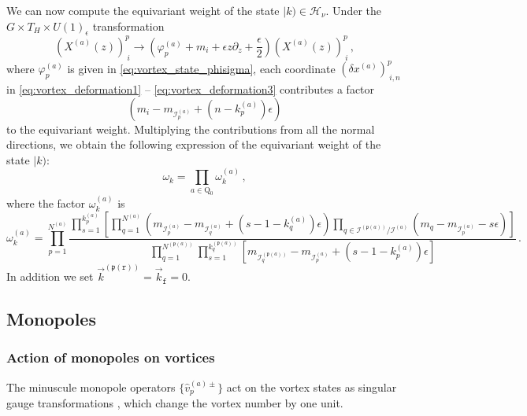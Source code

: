 \documentclass[12pt,a4paper]{article}
\renewcommand{\(}{\left(}
\renewcommand{\)}{\right)}
\newcommand{\eps}{\epsilon}
\renewcommand{\(}{\left(}
\renewcommand{\)}{\right)}
\begin{document}
We can now compute the equivariant weight of the state $|k)\in\mathcal{H}_\nu$. Under the $G\times T_H\times U(1)_\eps$ transformation
\begin{equation}
\left(X^{(a)}(z)\right)^p_{\ i}\longrightarrow (\varphi^{(a)}_p+m_i+\eps z\partial_z+\frac{\eps}{2})\left(X^{(a)}(z)\right)^p_{\ i}\,,
\end{equation}
where $\varphi^{(a)}_p$ is given in \eqref{eq:vortex_state_phisigma}, each coordinate $(\delta x^{(a)})^p_{\ i,n}$ in \eqref{eq:vortex_deformation1} -- \eqref{eq:vortex_deformation3} contributes a factor
\begin{equation}
(m_i-m_{\mathcal{I}^{(a)}_p}+(n-k^{(a)}_p)\eps)
\end{equation}
to the equivariant weight. Multiplying the contributions from all the normal directions, we obtain the following expression of the equivariant weight of the state $|k)$:
\begin{equation}\label{eq:omegak}
\omega_k=\prod_{a\in \mathrm{Q}_0}\omega^{(a)}_{k}\,,
\end{equation}
where the factor $\omega^{(a)}_{k}$ is
{\footnotesize
\begin{equation}
\omega^{(a)}_{k}=\prod_{p=1}^{N^{(a)}}\frac{\prod_{s=1}^{k^{(a)}_{p}}\left[\prod_{q=1}^{N^{(a)}}(m_{\mathcal{I}^{(a)}_{p}}-m_{\mathcal{I}^{(a)}_{q}}+(s-1-k^{(a)}_{q})\epsilon) \prod_{q\in \mathcal{I}^{(\mathfrak{p}(a))}/\mathcal{I}^{(a)}}(m_q-m_{\mathcal{I}^{(a)}_{p}}-s\epsilon)  \right]}{\prod_{q=1}^{N^{(\mathfrak{p}(a))}}\prod_{s=1}^{k^{(\mathfrak{p}(a))}_{q}}\left[m_{\mathcal{I}^{(\mathfrak{p}(a))}_{q}}-m_{\mathcal{I}^{(a)}_{p}}+(s-1-k^{(a)}_{p})\epsilon\right]}\,.
\end{equation}}
In addition we set $\vec{k}^{(\mathfrak{p}(\mathtt{r}))}=\vec{k}_{\mathtt{f}}=0$. 






\subsection{Monopoles}\label{ssec:monopole_operator}

\subsubsection{Action of monopoles on vortices}\label{sssec:monopole_action}

The minuscule monopole operators $\{\hat{v}^{(a)\pm}_{p}\}$ act on the vortex states as singular gauge transformations \cite{Bullimore:2016hdc}, which change the vortex number by one unit. 
\end{document}
